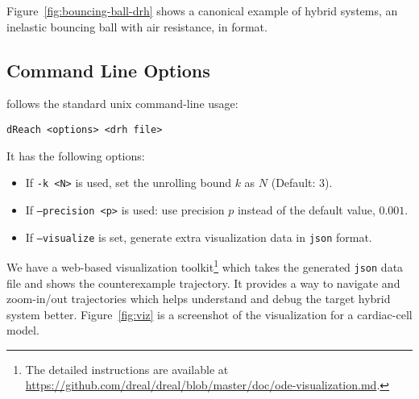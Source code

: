 Figure~\ref{fig:bouncing-ball-drh} shows a canonical example of hybrid
systems, an inelastic bouncing ball with air resistance, in \drh{}
format.

\subsection{Command Line Options}
\dReach{} follows the standard unix command-line usage:
\begin{Verbatim}[fontfamily=courier, framesep=1mm, fontsize=\small]
dReach <options> <drh file>
\end{Verbatim}
It has the following options:
\begin{itemize}
\item If \texttt{-k <N>} is used, set the unrolling bound $k$ as $N$
  (Default: 3).
\item If \texttt{--precision <p>} is used: use precision $p$ instead of
  the default value, $0.001$.
\item If \texttt{--visualize} is set, \dReach{} generate extra
  visualization data in \texttt{json} format.
\end{itemize}
We have a web-based visualization toolkit\footnote{The detailed
  instructions are available at
  \url{https://github.com/dreal/dreal/blob/master/doc/ode-visualization.md}.}
which takes the generated \texttt{json} data file and shows the
counterexample trajectory. It provides a way to navigate and
zoom-in/out trajectories which helps understand and debug the target
hybrid system better. Figure~\ref{fig:viz} is a screenshot of the
visualization for a cardiac-cell model.


